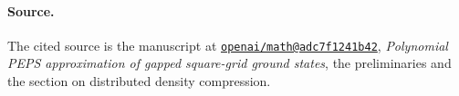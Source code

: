 \documentclass[11pt]{article}
\begin{document}
\paragraph{Source.}
The cited source is the manuscript at
\href{https://github.com/openai/math/tree/adc7f1241b42e322a6451854ab7e4b4c146bf78a}{\texttt{openai/math@adc7f1241b42}},
\emph{Polynomial PEPS approximation of gapped square-grid ground states},
the preliminaries and the section on distributed density compression.
\end{document}
